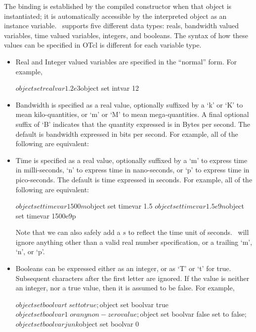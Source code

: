 The binding is established by the compiled constructor
when that object is instantiated;
it is automatically accessible by the interpreted object as 
an instance variable.
\ns\ supports five different data types: reals, bandwidth valued variables, 
time valued variables, integers, and booleans.
The syntax of how these values can be specified in OTcl is different
for each variable type.
\begin{itemize}\itemsep0pt
\item Real and Integer valued variables are specified in the ``normal'' form.
        For example,
        \begin{program}
        $object set realvar 1.2e3
        $object set intvar  12
        \end{program}
\item Bandwidth is specified as a real value, optionally
  suffixed by a `k' or `K' to mean kilo-quantities, or `m' or `M' to
  mean mega-quantities.
  A final optional suffix of `B' indicates that the quantity expressed
  is in Bytes per second.
  The default is bandwidth expressed in bits per second.
        For example, all of the following are equivalent:

\item Time is specified as a real value, optionally suffixed by a
  `m' to express time in milli-seconds, `n' to express time in
  nano-seconds, or `p' to express time in pico-seconds.
  The default is time expressed in seconds.
        For example, all of the following are equivalent:
        \begin{program}
        $object set timevar 1500m
        $object set timevar 1.5
        $object set timevar 1.5e9n
        $object set timevar 1500e9p
        \end{program}
  Note that we can also safely add a $s$ to reflect the time unit of seconds.
  \ns\ will ignore anything other than a valid real number specification,
  or a trailing `m', `n', or `p'.

\item Booleans can be expressed either as an integer, or as `T' or `t'
  for true.  Subsequent characters after the first letter are ignored.
  If the value is neither an integer, nor a true value,
  then it is assumed to be false.
        For example,
        \begin{program}
        $object set boolvar t           \; set to true;
        $object set boolvar true
        $object set boolvar 1   \; or any non-zero value;

        $object set boolvar false       \; set to false;
        $object set boolvar junk        
        $object set boolvar 0
        \end{program}

\end{itemize}

